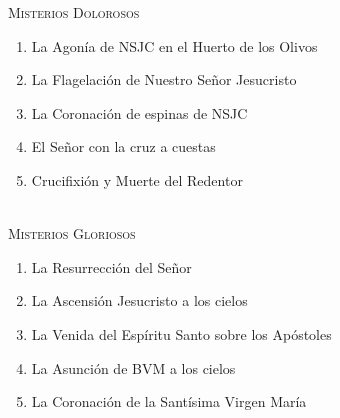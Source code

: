 \documentclass[9pt]{article}
\newcounter{lux-counter}
\begin{document}
\begin{multicols*}{2}
    \vspace{-5mm}

    \subsubsection*{ }
    \begin{flushright}
        \textorojo{}
    \end{flushright}
    \vspace{-2mm}
    \\[1mm]
    


    \small{}\\
    \textsc{Misterios Dolorosos}
    \begin{enumerate}
        \item La Agonía de NSJC en el Huerto de los Olivos
        \item La Flagelación de Nuestro Señor Jesucristo
        \item La Coronación de espinas de NSJC
        \item El Señor con la cruz a cuestas
        \item Crucifixión y Muerte del Redentor
    \end{enumerate}

    \vspace{2mm}

    \small{}\\
    \textsc{Misterios Gloriosos}
    \begin{enumerate}
        \item La Resurrección del Señor
        \item La Ascensión Jesucristo a los cielos
        \item La Venida del Espíritu Santo sobre los Apóstoles
        \item La Asunción de BVM a los cielos
        \item La Coronación de la Santísima Virgen María
    \end{enumerate}

    \vspace{2mm}

    \\[1mm]
    \\[1mm]
    \\[1mm]
    


\end{multicols*}
\end{document}
